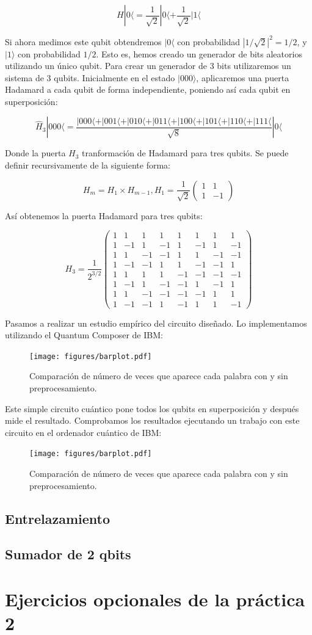 \documentclass[11pt]{article}
\newcommand{\ra}{\rangle}
\newcommand{\la}{\langle}
\begin{document}
\[
	H|0\la = \frac{1}{\sqrt 2} |0\la + \frac{1}{\sqrt 2} |1\la
\]

Si ahora medimos este qubit obtendremos $|0\la$ con probabilidad $|1/\sqrt 2|^2 = 1/2$, y $|1\ra$ con probabilidad $1/2$. Esto es, hemos creado un generador de bits aleatorios utilizando un único qubit. Para crear un generador de 3 bits utilizaremos un sistema de 3 qubits. Inicialmente en el estado $|000\ra$, aplicaremos una puerta Hadamard a cada qubit de forma independiente, poniendo así cada qubit en superposición:

\[
	\hat H_3|000\la = \frac{|000\la + |001\la + |010\la + |011\la + |100\la + |101\la + |110\la + |111\la}{\sqrt 8} |0\la
\]

Donde la puerta $H_3$ tranformación de Hadamard para tres qubits. Se puede definir recursivamente de la siguiente forma:

\[
	H_m = H_1 \times H_{m-1}, H_1 = \frac{1}{\sqrt 2}
	\begin{pmatrix}
		1 & 1 \\
		1 & -1 
	\end{pmatrix}
\]

Así obtenemos la puerta Hadamard para tres qubits:

\[
H_3 = \frac{1}{2^{3/2}}
\begin{pmatrix}
	1 & 1 & 1 & 1 & 1 & 1 & 1 & 1 \\
	1 & -1 & 1 & -1 & 1 & -1 & 1 & -1 \\
	1 & 1 & -1 & -1 & 1 & 1 & -1 & -1 \\
	1 & -1 & -1 & 1 & 1 & -1 & -1 & 1 \\
	1 & 1 & 1 & 1 & -1 & -1 & -1 & -1 \\
	1 & -1 & 1 & -1 & -1 & 1 & -1 & 1 \\
	1 & 1 & -1 & -1 & -1 & -1 & 1 & 1 \\
	1 & -1 & -1 & 1 & -1 & 1 & 1 & -1
\end{pmatrix}
\]

Pasamos a realizar un estudio empírico del circuito diseñado. Lo implementamos utilizando el Quantum Composer de IBM:

\begin{figure}[H]
	\centering
	\texttt{[image: figures/barplot.pdf]}
	\caption{Comparación de número de veces que aparece cada palabra con y sin preprocesamiento.}
\end{figure}

Este simple circuito cuántico pone todos los qubits en superposición y después mide el resultado. Comprobamos los resultados ejecutando un trabajo con este circuito en el ordenador cuántico de IBM:

\begin{figure}[H]
	\centering
	\texttt{[image: figures/barplot.pdf]}
	\caption{Comparación de número de veces que aparece cada palabra con y sin preprocesamiento.}
\end{figure}


\subsection{Entrelazamiento}

\subsection{Sumador de 2 qbits}

\section{Ejercicios opcionales de la práctica 2}
\end{document}

